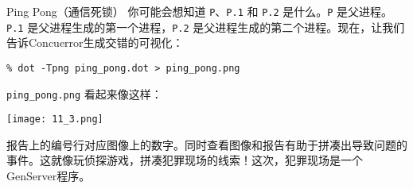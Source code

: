 \begin{example}{Ping Pong（通信死锁）}
你可能会想知道
\texttt{P}、\texttt{P.1} 和
\texttt{P.2} 是什么。\texttt{P}
是父进程。\texttt{P.1}
是父进程生成的第一个进程，\texttt{P.2}
是父进程生成的第二个进程。现在，让我们告诉Concuerror生成交错的可视化：

\begin{code}{}\begin{verbatim}
% dot -Tpng ping_pong.dot > ping_pong.png
\end{verbatim}
\end{code}

\texttt{ping\_pong.png} 看起来像这样：

    \texttt{[image: 11\_3.png]}
    \label{fig:11_3}

\end{example}

报告上的编号行对应图像上的数字。同时查看图像和报告有助于拼凑出导致问题的事件。这就像玩侦探游戏，拼凑犯罪现场的线索！这次，犯罪现场是一个GenServer程序。

